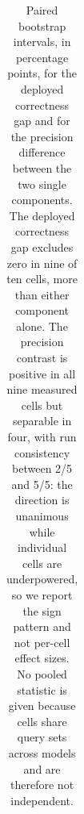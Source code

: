 \begin{table}[t]
\begin{tabular}{@{}llccccc@{}}
\bottomrule
\end{tabular}
\caption{Paired bootstrap intervals, in percentage points, for the
deployed correctness gap and for the precision difference between the two
single components. The deployed correctness gap excludes zero in nine of ten
cells, more than either component alone. The precision contrast is positive in
all nine measured cells but separable in four, with run consistency between
2/5 and 5/5: the direction is unanimous while individual cells are
underpowered, so we report the sign pattern and not per-cell effect sizes. No
pooled statistic is given because cells share query sets across models and are
therefore not independent.}
\label{tab:fci2}
\end{table}

